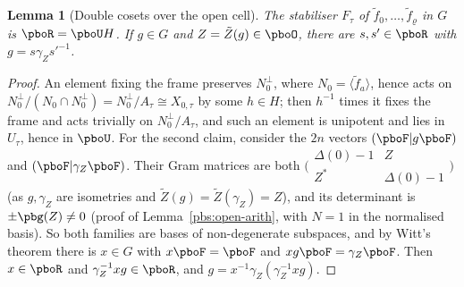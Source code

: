 \documentclass[10pt]{amsart}
\newtheorem{lemma}[theorem]{Lemma}
\theoremstyle{definition}
\theoremstyle{remark}
\newcommand{\Z}{\mathbb Z}
\begin{document}
\begin{lemma}[Double cosets over the open cell]\label{pbo:witt}
The stabiliser $F_\tau$ of $\tilde f_0,\dots,\tilde f_\varrho$ in $G$ is $\pboR=\pboU H$. If $g\in G$ and
$Z=\tilde Z(g)\in\pboO$, there are $s,s'\in\pboR$ with $g=s\gamma_Zs'^{-1}$.
\end{lemma}
\begin{proof}
An element fixing the frame preserves $N_0^\perp$, where $N_0=\langle\tilde f_a\rangle$, hence acts on
$N_0^\perp/(N_0\cap N_0^\perp)=N_0^\perp/A_\tau\cong X_{0,\tau}$ by some $h\in H$; then $h^{-1}$ times it
fixes the frame and acts trivially on $N_0^\perp/A_\tau$, and such an element is unipotent and lies in
$U_\tau$, hence in $\pboU$. For the second claim, consider the $2n$ vectors $(\pboF|g\pboF)$ and
$(\pboF|\gamma_Z\pboF)$. Their Gram matrices are both $\bigl(\begin{smallmatrix}\Delta(0)-1&Z\\Z^*&\Delta
(0)-1\end{smallmatrix}\bigr)$ (as $g,\gamma_Z$ are isometries and $\tilde Z(g)=\tilde Z(\gamma_Z)=Z$), and
its determinant is $\pm\pbg(Z)\ne0$ (proof of Lemma~\ref{pbs:open-arith}, with $N=1$ in the normalised
basis). So both families are bases of non-degenerate subspaces, and by Witt's theorem there is
$x\in G$ with $x\pboF=\pboF$ and $xg\pboF=\gamma_Z\pboF$. Then $x\in\pboR$ and $\gamma_Z^{-1}xg\in\pboR$, and
$g=x^{-1}\gamma_Z(\gamma_Z^{-1}xg)$.
\end{proof}
\end{document}
